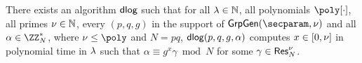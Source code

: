 \begin{lemma}\label{lemma:benaloh:efficient-dlog}
	There exists an algorithm $\mathsf{dlog}$ such that for all $\lambda \in \mathbb{N}$, all polynomials $\poly[\cdot]$, all primes $\nu \in \mathbb{N}$, every $(p, q, g)$ in the support of $\GrpGen(\secparam, \bemod)$ and all $\alpha \in \Z^\ast_N$, where $\bemod \le \poly$ and $N = pq$, $\mathsf{dlog}(p, q, g, \alpha)$ computes $x \in [0, \nu]$ in polynomial time in $\lambda$ such that $\alpha \equiv g^x \gamma \bmod{N}$ for some $\gamma \in \mathsf{Res}^{\nu}_{N}$.
\end{lemma}

